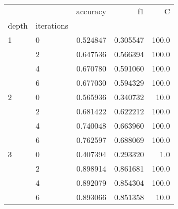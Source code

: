 \begin{tabular}{llrrr}
\toprule
  &   &  accuracy &        f1 &      C \\
depth & iterations &           &           &        \\
\midrule
1 & 0 &  0.524847 &  0.305547 &  100.0 \\
  & 2 &  0.647536 &  0.566394 &  100.0 \\
  & 4 &  0.670780 &  0.591060 &  100.0 \\
  & 6 &  0.677030 &  0.594329 &  100.0 \\
2 & 0 &  0.565936 &  0.340732 &   10.0 \\
  & 2 &  0.681422 &  0.622212 &  100.0 \\
  & 4 &  0.740048 &  0.663960 &  100.0 \\
  & 6 &  0.762597 &  0.688069 &  100.0 \\
3 & 0 &  0.407394 &  0.293320 &    1.0 \\
  & 2 &  0.898914 &  0.861681 &  100.0 \\
  & 4 &  0.892079 &  0.854304 &  100.0 \\
  & 6 &  0.893066 &  0.851358 &   10.0 \\
\bottomrule
\end{tabular}
